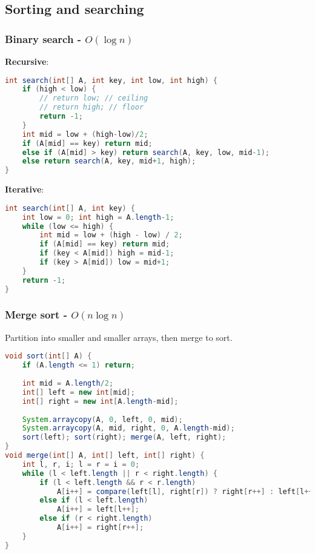 
\subsection{Sorting and searching}

\subsubsection{Binary search - $O(\log n)$}
\textbf{Recursive}:
\begin{lstlisting}[language=java]
int search(int[] A, int key, int low, int high) {
    if (high < low) {
        // return low; // ceiling
        // return high; // floor
        return -1;
    }
    int mid = low + (high-low)/2;
    if (A[mid] == key) return mid;
    else if (A[mid] > key) return search(A, key, low, mid-1);
    else return search(A, key, mid+1, high);
}
\end{lstlisting}
\textbf{Iterative}:
\begin{lstlisting}[language=java]
int search(int[] A, int key) {
    int low = 0; int high = A.length-1;
    while (low <= high) {
        int mid = low + (high - low) / 2;
        if (A[mid] == key) return mid;
        if (key < A[mid]) high = mid-1;
        if (key > A[mid]) low = mid+1;
    }
    return -1;
}
\end{lstlisting}{}

\subsubsection{Merge sort - $O(n\log n)$}
Partition into smaller and smaller arrays, then merge to sort.
\begin{lstlisting}[language=java]
void sort(int[] A) {
    if (A.length <= 1) return;
    
    int mid = A.length/2;
    int[] left = new int[mid];
    int[] right = new int[A.length-mid];
    
    System.arraycopy(A, 0, left, 0, mid);
    System.arraycopy(A, mid, right, 0, A.length-mid);
    sort(left); sort(right); merge(A, left, right);
}
void merge(int[] A, int[] left, int[] right) {
    int l, r, i; l = r = i = 0;
    while (l < left.length || r < right.length) {
        if (l < left.length && r < r.length)
            A[i++] = compare(left[l], right[r]) ? right[r++] : left[l++];
        else if (l < left.length)
            A[i++] = left[l++];
        else if (r < right.length)
            A[i++] = right[r++];
    }    
}
\end{lstlisting}

